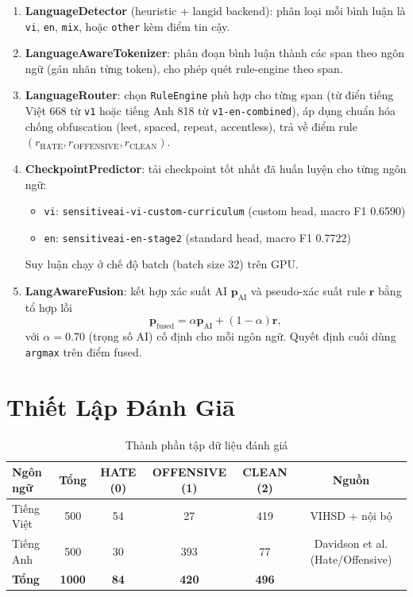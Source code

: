 \documentclass[11pt,a4paper]{article}
\begin{document}
\begin{enumerate}
    \item \textbf{LanguageDetector} (heuristic + langid backend): phân loại mỗi bình luận là \texttt{vi}, \texttt{en}, \texttt{mix}, hoặc \texttt{other} kèm điểm tin cậy.
    \item \textbf{LanguageAwareTokenizer}: phân đoạn bình luận thành các span theo ngôn ngữ (gán nhãn từng token), cho phép quét rule-engine theo span.
    \item \textbf{LanguageRouter}: chọn \texttt{RuleEngine} phù hợp cho từng span (từ điển tiếng Việt 668 từ \texttt{v1} hoặc tiếng Anh 818 từ \texttt{v1-en-combined}), áp dụng chuẩn hóa chống obfuscation (leet, spaced, repeat, accentless), trả về điểm rule $(r_{\text{HATE}}, r_{\text{OFFENSIVE}}, r_{\text{CLEAN}})$.
    \item \textbf{CheckpointPredictor}: tải checkpoint tốt nhất đã huấn luyện cho từng ngôn ngữ:
          \begin{itemize}
              \item \texttt{vi}: \texttt{sensitiveai-vi-custom-curriculum} (custom head, macro F1 0.6590)
              \item \texttt{en}: \texttt{sensitiveai-en-stage2} (standard head, macro F1 0.7722)
          \end{itemize}
          Suy luận chạy ở chế độ batch (batch size 32) trên GPU.
    \item \textbf{LangAwareFusion}: kết hợp xác suất AI $\mathbf{p}_{\text{AI}}$ và pseudo-xác suất rule $\mathbf{r}$ bằng tổ hợp lồi
          \begin{equation}
              \mathbf{p}_{\text{fused}} = \alpha \mathbf{p}_{\text{AI}} + (1-\alpha) \mathbf{r},
          \end{equation}
          với $\alpha = 0.70$ (trọng số AI) cố định cho mỗi ngôn ngữ. Quyết định cuối dùng \texttt{argmax} trên điểm fused.
\end{enumerate}

\section{Thiết Lập Đánh Giā}
\label{sec:setup}

\begin{table}[H]
    \centering
    \caption{Thành phần tập dữ liệu đánh giá}
    \label{tab:dataset}
    \small
    \begin{tabular}{lccccc}
        \toprule
        Ngôn ngữ      & Tổng          & HATE (0)    & OFFENSIVE (1) & CLEAN (2)    & Nguồn                            \\
        \midrule
        Tiếng Việt    & 500           & 54          & 27            & 419          & VIHSD + nội bộ                   \\
        Tiếng Anh     & 500           & 30          & 393           & 77           & Davidson et al. (Hate/Offensive) \\
        \midrule
        \textbf{Tổng} & \textbf{1000} & \textbf{84} & \textbf{420}  & \textbf{496} &                                  \\
        \bottomrule
    \end{tabular}
\end{table}
\end{document}
